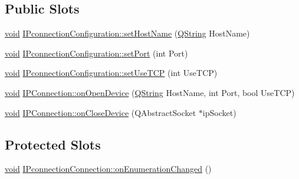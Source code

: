 \subsection*{\-Public \-Slots}
\begin{DoxyCompactItemize}
\item 
\hyperlink{group___u_a_v_objects_plugin_ga444cf2ff3f0ecbe028adce838d373f5c}{void} \hyperlink{group___i_p_conn_plugin_ga88855a0ecb5df4caaf47450815ff761a}{\-I\-Pconnection\-Configuration\-::set\-Host\-Name} (\hyperlink{group___u_a_v_objects_plugin_gab9d252f49c333c94a72f97ce3105a32d}{\-Q\-String} \-Host\-Name)
\item 
\hyperlink{group___u_a_v_objects_plugin_ga444cf2ff3f0ecbe028adce838d373f5c}{void} \hyperlink{group___i_p_conn_plugin_gacce8d065ea6dd85639e0e1aea893ce9c}{\-I\-Pconnection\-Configuration\-::set\-Port} (int \-Port)
\item 
\hyperlink{group___u_a_v_objects_plugin_ga444cf2ff3f0ecbe028adce838d373f5c}{void} \hyperlink{group___i_p_conn_plugin_ga58320607e7ef94199aa35fd7b7b4df21}{\-I\-Pconnection\-Configuration\-::set\-Use\-T\-C\-P} (int \-Use\-T\-C\-P)
\item 
\hyperlink{group___u_a_v_objects_plugin_ga444cf2ff3f0ecbe028adce838d373f5c}{void} \hyperlink{group___i_p_conn_plugin_ga2620fdde71bd8399a44eeec513197962}{\-I\-P\-Connection\-::on\-Open\-Device} (\hyperlink{group___u_a_v_objects_plugin_gab9d252f49c333c94a72f97ce3105a32d}{\-Q\-String} \-Host\-Name, int \-Port, bool \-Use\-T\-C\-P)
\item 
\hyperlink{group___u_a_v_objects_plugin_ga444cf2ff3f0ecbe028adce838d373f5c}{void} \hyperlink{group___i_p_conn_plugin_gac260d56bd7a0226cc1c047062b705314}{\-I\-P\-Connection\-::on\-Close\-Device} (\-Q\-Abstract\-Socket $\ast$ip\-Socket)
\end{DoxyCompactItemize}
\subsection*{\-Protected \-Slots}
\begin{DoxyCompactItemize}
\item 
\hyperlink{group___u_a_v_objects_plugin_ga444cf2ff3f0ecbe028adce838d373f5c}{void} \hyperlink{group___i_p_conn_plugin_ga1163b3efc22084c70e47aa84ac84c612}{\-I\-Pconnection\-Connection\-::on\-Enumeration\-Changed} ()
\end{DoxyCompactItemize}
